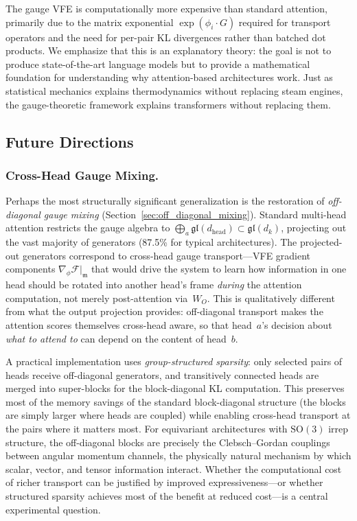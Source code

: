 \documentclass[twoside,11pt]{article}
\begin{document}
The gauge VFE is computationally more expensive than standard attention, primarily due to the matrix exponential $\exp(\phi_i \cdot G)$ required for transport operators and the need for per-pair KL divergences rather than batched dot products. We emphasize that this is an explanatory theory: the goal is not to produce state-of-the-art language models but to provide a mathematical foundation for understanding why attention-based architectures work. Just as statistical mechanics explains thermodynamics without replacing steam engines, the gauge-theoretic framework explains transformers without replacing them.

\subsection{Future Directions}

\subsubsection{Cross-Head Gauge Mixing.}

Perhaps the most structurally significant generalization is the restoration of \emph{off-diagonal gauge mixing} (Section~\ref{sec:off_diagonal_mixing}). Standard multi-head attention restricts the gauge algebra to $\bigoplus_a \mathfrak{gl}(d_{\mathrm{head}}) \subset \mathfrak{gl}(d_k)$, projecting out the vast majority of generators (87.5\% for typical architectures). The projected-out generators correspond to cross-head gauge transport---VFE gradient components $\nabla_\phi \mathcal{F}\big|_{\mathfrak{m}}$ that would drive the system to learn how information in one head should be rotated into another head's frame \emph{during} the attention computation, not merely post-attention via~$W_O$. This is qualitatively different from what the output projection provides: off-diagonal transport makes the attention scores themselves cross-head aware, so that head~$a$'s decision about \emph{what to attend to} can depend on the content of head~$b$.

A practical implementation uses \emph{group-structured sparsity}: only selected pairs of heads receive off-diagonal generators, and transitively connected heads are merged into super-blocks for the block-diagonal KL computation. This preserves most of the memory savings of the standard block-diagonal structure (the blocks are simply larger where heads are coupled) while enabling cross-head transport at the pairs where it matters most. For equivariant architectures with $\mathrm{SO}(3)$ irrep structure, the off-diagonal blocks are precisely the Clebsch--Gordan couplings between angular momentum channels, the physically natural mechanism by which scalar, vector, and tensor information interact. Whether the computational cost of richer transport can be justified by improved expressiveness---or whether structured sparsity achieves most of the benefit at reduced cost---is a central experimental question.
\end{document}

